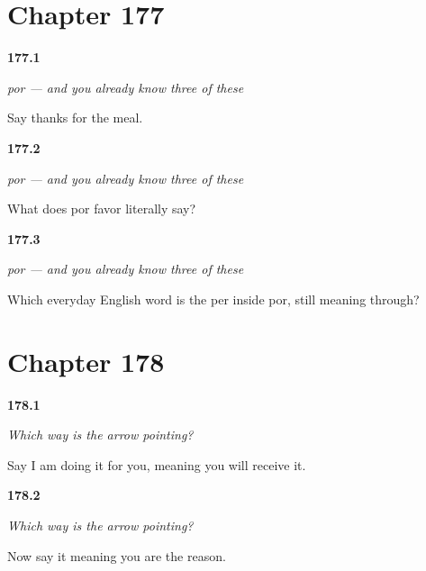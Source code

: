 \section*{Chapter 177}

\noindent\begin{minipage}[t]{\linewidth}
\raggedright
\hypertarget{review-ES-C51-por-thanks}{\textbf{177.1}} \emph{por — and you already know three of these}\par
\small Say thanks for the meal.
\end{minipage}\par\medskip

\noindent\begin{minipage}[t]{\linewidth}
\raggedright
\hypertarget{review-ES-C51-por-favor}{\textbf{177.2}} \emph{por — and you already know three of these}\par
\small What does por favor literally say?
\end{minipage}\par\medskip

\noindent\begin{minipage}[t]{\linewidth}
\raggedright
\hypertarget{review-ES-C51-por-per}{\textbf{177.3}} \emph{por — and you already know three of these}\par
\small Which everyday English word is the per inside por, still meaning through?
\end{minipage}\par\medskip

\section*{Chapter 178}

\noindent\begin{minipage}[t]{\linewidth}
\raggedright
\hypertarget{review-ES-C51-la-flecha-gift}{\textbf{178.1}} \emph{Which way is the arrow pointing?}\par
\small Say I am doing it for you, meaning you will receive it.
\end{minipage}\par\medskip

\noindent\begin{minipage}[t]{\linewidth}
\raggedright
\hypertarget{review-ES-C51-la-flecha-cause}{\textbf{178.2}} \emph{Which way is the arrow pointing?}\par
\small Now say it meaning you are the reason.
\end{minipage}\par\medskip

